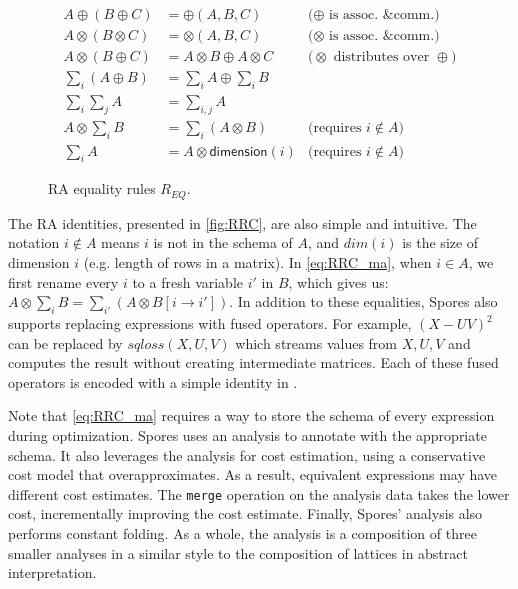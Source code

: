 \begin{figure}
\centering
\begin{align}
  \label{eq:RRC_pp} A \oplus (B \oplus C) &= \oplus (A, B, C)
  & \text{($\oplus$ is assoc. \& comm.)}
  \\
  \label{eq:RRC_mm} A \otimes (B \otimes C) &= \otimes (A, B, C)
  & \text{($\otimes$ is assoc. \& comm.)}
  \\
  \label{eq:RRC_mp} A \otimes (B \oplus C) &= A \otimes B \oplus A \otimes C
  & \text{($\otimes$ distributes over $\oplus$)}
  \\
  \label{eq:RRC_ap} \sum_i (A \oplus B) &= \sum_i A \oplus \sum_i B
  \\
  \label{eq:RRC_aa} \sum_i \sum_j A &= \sum_{i,j} A
  \\
  \label{eq:RRC_ma} A \otimes \sum_i B &= \sum_i (A \otimes B)
  &\text{(requires $i \not\in A$)}
  \\
  \label{eq:RRC_ac} \sum_i A &= A \otimes \textsf{dimension}(i)
  &\text{(requires $i \not\in A$)}
\end{align}
\caption{RA equality rules $R_{EQ}$.}
\label{fig:RRC}
\end{figure}

The RA identities, presented in \autoref{fig:RRC}, are also simple and intuitive.
The notation $i \not\in A$ means $i$ is not in the schema of $A$, and $dim(i)$
is the size of dimension $i$ (e.g. length of rows in a matrix). In
\autoref{eq:RRC_ma}, when $i \in A$, we first rename every $i$ to a fresh variable
$i'$ in $B$, which gives us: $A \otimes \sum_i B = \sum_{i'} (A \otimes B[i
\rightarrow i'])$. In addition to these equalities, Spores also supports
replacing expressions with fused operators. For example, $(X-UV)^2$ can be
replaced by $sqloss(X, U, V)$ which streams values from $X, U, V$ and
computes the result without creating intermediate matrices. Each of these fused
operators is encoded with a simple identity in \Egg.

Note that \autoref{eq:RRC_ma} requires a way
to store the schema of every expression during optimization.
Spores uses an \eclass analysis to annotate \eclasses with the appropriate
  schema. It also leverages the \eclass analysis for cost estimation,
  using a conservative cost model that overapproximates.
As a result, equivalent expressions may have different cost estimates.
The \texttt{merge} operation on the analysis data takes the lower cost,
  incrementally improving the cost estimate.
Finally, Spores' \eclass analysis also performs constant folding.
As a whole, the \eclass analysis is a composition of three smaller analyses
  in a similar style to the composition of lattices in abstract interpretation.

